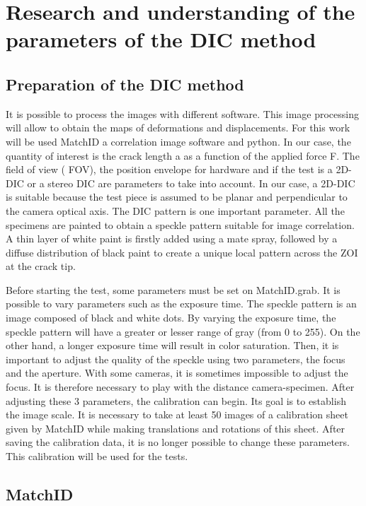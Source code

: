 \section{Research and understanding of the parameters of the DIC method}

\subsection{Preparation of the DIC method}

It is possible to process the images with different software. This image processing will allow to obtain the maps of deformations and displacements. For this work will be used MatchID a correlation image software and python.
In our case, the quantity of interest is the crack length a as a function of the applied force F. The field of view ( FOV), the position envelope for hardware and if the test is a 2D-DIC or a stereo DIC are parameters to take into account. In our case, a 2D-DIC is suitable because the test piece is assumed to be planar and perpendicular to the camera optical axis. The DIC pattern is one important parameter. All the specimens are painted to obtain a speckle pattern suitable for image correlation. A thin layer of white paint is firstly added using a mate spray, followed by a diffuse distribution of black paint to create a unique local pattern across the ZOI at the crack tip.

Before starting the test, some parameters must be set on MatchID.grab. It is possible to vary parameters such as the exposure time. The speckle pattern is an image composed of black and white dots. By varying the exposure time, the speckle pattern will have a greater or lesser range of gray (from 0 to 255). On the other hand, a longer exposure time will result in color saturation. Then, it is important to adjust the quality of the speckle using two parameters, the focus and the aperture. With some cameras, it is sometimes impossible to adjust the focus. It is therefore necessary to play with the distance camera-specimen. After adjusting these 3 parameters, the calibration can begin. Its goal is to establish the image scale. It is necessary to take at least 50 images of a calibration sheet given by MatchID while making translations and rotations of this sheet.
After saving the calibration data, it is no longer possible to change these parameters. This calibration will be used for the tests.

\subsection{MatchID}

